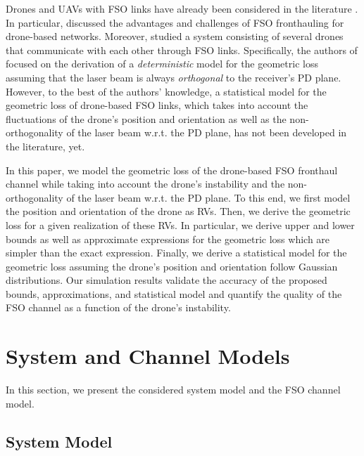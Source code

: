 \documentclass[conference]{IEEEtran}
\begin{document}
Drones and UAVs with FSO links have already been considered in the literature \cite{Alouini_Drone,UAV_FSO,Data_Collection_UAV_FSO,Inter-UAV_FSO}. In particular, \cite{Alouini_Drone} discussed the advantages and challenges of FSO fronthauling for drone-based networks. Moreover, \cite{UAV_FSO,Data_Collection_UAV_FSO,Inter-UAV_FSO} studied a system consisting of several drones that communicate with each other through FSO links. Specifically, the authors of \cite{UAV_FSO} focused on the derivation of a \textit{deterministic} model for the geometric loss assuming that the laser beam is always \textit{orthogonal} to the receiver's PD plane. However, to the best of the authors' knowledge, a statistical model for the geometric loss of  drone-based FSO links, which takes into account the fluctuations of the drone's position and orientation as well as the non-orthogonality of the laser beam w.r.t. the PD plane, has not been developed in the literature, yet.

In this paper, we model the geometric loss of the drone-based FSO fronthaul channel while taking into account the drone's instability and the non-orthogonality of the laser beam w.r.t. the PD plane. To this end, we first model the position and orientation of the drone as RVs. Then, we derive the geometric loss for a given realization of these RVs. In particular, we derive upper and lower bounds as well as approximate expressions for the geometric loss which are simpler than the exact expression. Finally, we derive a statistical model for the geometric loss assuming the drone's position and orientation follow Gaussian distributions. Our simulation results validate the accuracy of the proposed bounds, approximations, and statistical model and quantify the quality of the FSO channel as a function of the drone's instability.



\section{System and Channel Models}
In this section, we present the considered system model and the FSO channel model. 
\subsection{System Model}
\end{document}
